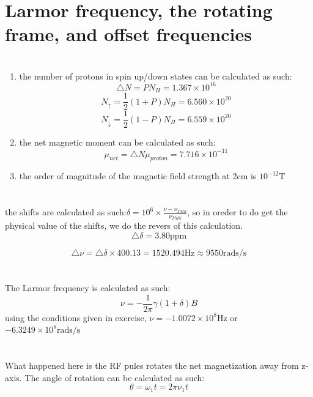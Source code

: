 \documentclass[11pt]{article}
\begin{document}
\section*{Larmor frequency, the rotating frame, and offset frequencies }
\section{}
\begin{enumerate}[label=\alph*)]
    \item the number of protons in spin up/down states can be calculated as such:
    \[
        \triangle N = P N_H = 1.367 \times 10^{16}
    \]
    \[
        N_{\uparrow} =\frac{1}{2} (1+P) N_H = 6.560 \times 10^{20}
    \]
    \[
        N_{\downarrow} =\frac{1}{2} (1-P) N_H = 6.559 \times 10^{20}
    \]

    \item the net magnetic moment can be calculated as such:
    \[
    \mu_{net} = \triangle N \mu_{proton} = 7.716 \times 10^{-11}
    \]

    \item the order of magnitude of the magnetic field strength at 2cm is $10^{-12}\text{T}$
\end{enumerate}

\section{}
the shifts are calculated as such:$\delta = 10^{6} \times \frac{\nu - \nu_{TMS}}{\nu_{TMS}}$, so in oreder to do get the physical value of the shifts, we do the revers of this calculation.
\[
    \triangle \delta = 3.80\text{ppm}
\]

\[
    \triangle \nu = \triangle \delta \times 400.13 = 1520.494 \text{Hz} \approx 9550 \text{rads/s}
\]

\section{}
The Larmor frequency is calculated as such: 
\[
    \nu = -\frac{1}{2\pi}\gamma(1+\delta)B
\]
using the conditions given in exercise, $\nu = -1.0072 \times 10^8 \text{Hz}$ or $ -6.3249 \times 10^{8}\text{rads/s}$

\section{}
What happened here is the RF pules rotates the net magnetization away from z-axis. The angle of rotation can be calculated as such:
\[
    \theta = \omega_1 t = 2\pi \nu_1 t
\]
\end{document}
